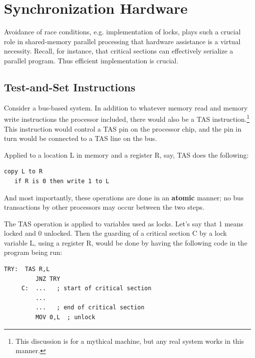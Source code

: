 
\section{Synchronization Hardware}

Avoidance of race conditions, e.g. implementation of locks, plays such a
crucial role in shared-memory parallel processing that hardware
assistance is a virtual necessity.  Recall, for instance, that critical
sections can effectively serialize a parallel program.  Thus efficient
implementation is crucial.

\subsection{Test-and-Set Instructions}

Consider a bus-based system. In addition to whatever memory read and
memory write instructions the processor included, there would also be a
TAS instruction.\footnote{This discussion is for a mythical machine, but
any real system works in this manner.}  This instruction would control a
TAS pin on the processor chip, and the pin in turn would be connected to
a TAS line on the bus.

Applied to a location L in memory and a register R, say, TAS does the
following:

\begin{Verbatim}[fontsize=\relsize{-2}]
   copy L to R
   if R is 0 then write 1 to L
\end{Verbatim}

And most importantly, these operations are done in an \textbf{atomic}
manner; no bus transactions by other processors may occur between the
two steps.

The TAS operation is applied to variables used as locks. Let's say that
1 means locked and 0 unlocked. Then the guarding of a critical section C
by a lock variable L, using a register R, would be done by having the
following code in the program being run:

\begin{Verbatim}[fontsize=\relsize{-2}]
   TRY:  TAS R,L
         JNZ TRY
     C:  ...   ; start of critical section
         ...
         ...   ; end of critical section
         MOV 0,L  ; unlock
\end{Verbatim}


